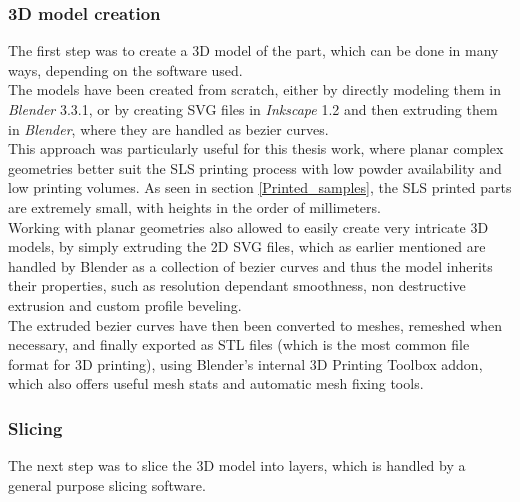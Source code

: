 \documentclass{article}
\begin{document}
          \subsubsection{3D model creation\label{3D_model_creation}}
  
          The first step was to create a 3D model of the part, which can be done in many ways, 
          depending on the software used. \\
  
          The models have been created from scratch, either by directly modeling them in \textit{Blender} 3.3.1,
          or by creating SVG files in \textit{Inkscape} 1.2 and then extruding them in \textit{Blender}, where
          they are handled as bezier curves. \\
  
          This approach was particularly useful for this thesis work, where planar complex geometries better suit the SLS printing process
          with low powder availability and low printing volumes. As seen in section \ref{Printed_samples}, the SLS printed parts 
          are extremely small, with heights in the order of millimeters. \\
          
          Working with planar geometries also allowed to easily create very intricate 3D models, by simply extruding the 2D SVG files, 
          which as earlier mentioned are handled by Blender as a collection of bezier curves and thus the model inherits their properties, such as resolution 
          dependant smoothness, non destructive extrusion and custom profile beveling. \\
  
          The extruded bezier curves have then been converted to meshes, remeshed when necessary, and finally 
          exported as STL files (which is the most common file format for 3D printing), using 
          Blender's internal 3D Printing Toolbox addon, which also offers useful mesh stats and 
          automatic mesh fixing tools. \\
          
          \subsubsection{Slicing\label{Slicing}}
          
          The next step was to slice the 3D model into layers, which is handled by a general purpose slicing software. \\
  
\end{document}
